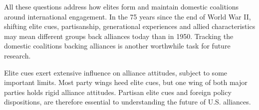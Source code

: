 \documentclass[12pt]{article}
\begin{document}
All these questions address how elites form and maintain domestic coalitions around international engagement. 
In the 75 years since the end of World War II, shifting elite cues, partisanship, generational experiences and allied characteristics may mean different groups back alliances today than in 1950. 
Tracking the domestic coalitions backing alliances is another worthwhile task for future research.


Elite cues exert extensive influence on alliance attitudes, subject to some important limits.
Most party wings heed elite cues, but one wing of both major parties holds rigid alliance attitudes. 
Partisan elite cues and foreign policy dispositions, are therefore essential to understanding the future of U.S. alliances.



\newpage

 
 
\end{document}
